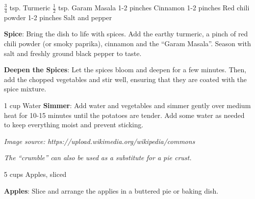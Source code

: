 \documentclass{article}
\begin{document}
\begin{step}
$\frac{3}{4}$ tsp. Turmeric
$\frac{1}{2}$ tsp. Garam Masala
1-2 pinches Cinnamon 
1-2 pinches Red chili powder 
1-2 pinches Salt and pepper

\method
\textbf{Spice}: Bring the dish to life with spices. Add the earthy turmeric, a pinch of red chili powder (or smoky paprika), cinnamon and the ``Garam Masala''. Season with salt and freshly ground black pepper to taste.

\textbf{Deepen the Spices}: Let the spices bloom and deepen for a few minutes. Then, add the chopped vegetables and stir well, ensuring that they are coated with the spice mixture.
\end{step}

\begin{step}
1 cup Water
\method
\textbf{Simmer}: Add water and vegetables and simmer gently over medium heat for 10-15 minutes until the potatoes are tender. Add some water as needed to keep everything moist and prevent sticking.
\end{step}

\vspace{-0.6cm}
\vspace{-0.5cm}
\textit{\tiny Image source: https://upload.wikimedia.org/wikipedia/commons}


\textit{The “crumble” can also be used as a substitute for a pie crust.}
\bigskip

\dishType{\dessert}
\dishOther{\vegetarian}

\begin{step}
5 cups Apples, sliced

\method
\textbf{Apples}: Slice and arrange the applies in a buttered pie or baking dish.
\end{step}
\end{document}
